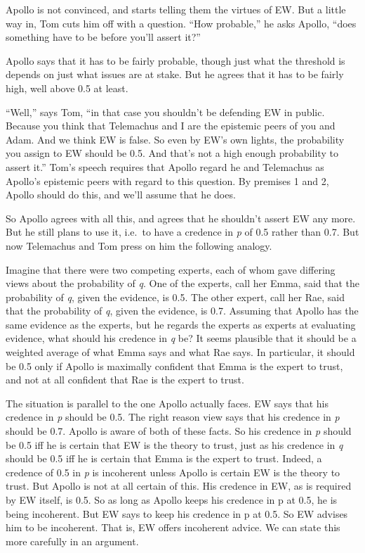 \documentclass[
  10pt,
  letterpaper,
  DIV=11,
  numbers=noendperiod,
  twoside]{scrartcl}
\begin{document}
Apollo is not convinced, and starts telling them the virtues of EW. But
a little way in, Tom cuts him off with a question. ``How probable,'' he
asks Apollo, ``does something have to be before you'll assert it?''

Apollo says that it has to be fairly probable, though just what the
threshold is depends on just what issues are at stake. But he agrees
that it has to be fairly high, well above 0.5 at least.

``Well,'' says Tom, ``in that case you shouldn't be defending EW in
public. Because you think that Telemachus and I are the epistemic peers
of you and Adam. And we think EW is false. So even by EW's own lights,
the probability you assign to EW should be 0.5. And that's not a high
enough probability to assert it.'' Tom's speech requires that Apollo
regard he and Telemachus as Apollo's epistemic peers with regard to this
question. By premises 1 and 2, Apollo should do this, and we'll assume
that he does.

So Apollo agrees with all this, and agrees that he shouldn't assert EW
any more. But he still plans to use it, i.e.~to have a credence in
\emph{p} of 0.5 rather than 0.7. But now Telemachus and Tom press on him
the following analogy.

Imagine that there were two competing experts, each of whom gave
differing views about the probability of \emph{q}. One of the experts,
call her Emma, said that the probability of \emph{q}, given the
evidence, is 0.5. The other expert, call her Rae, said that the
probability of \emph{q}, given the evidence, is 0.7. Assuming that
Apollo has the same evidence as the experts, but he regards the experts
as experts at evaluating evidence, what should his credence in \emph{q}
be? It seems plausible that it should be a weighted average of what Emma
says and what Rae says. In particular, it should be 0.5 only if Apollo
is maximally confident that Emma is the expert to trust, and not at all
confident that Rae is the expert to trust.

The situation is parallel to the one Apollo actually faces. EW says that
his credence in \emph{p} should be 0.5. The right reason view says that
his credence in \emph{p} should be 0.7. Apollo is aware of both of these
facts. So his credence in \emph{p} should be 0.5 iff he is certain that
EW is the theory to trust, just as his credence in \emph{q} should be
0.5 iff he is certain that Emma is the expert to trust. Indeed, a
credence of 0.5 in \emph{p} is incoherent unless Apollo is certain EW is
the theory to trust. But Apollo is not at all certain of this. His
credence in EW, as is required by EW itself, is 0.5. So as long as
Apollo keeps his credence in p at 0.5, he is being incoherent. But EW
says to keep his credence in p at 0.5. So EW advises him to be
incoherent. That is, EW offers incoherent advice. We can state this more
carefully in an argument.
\end{document}
